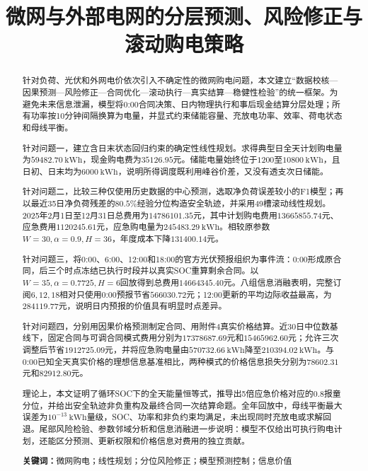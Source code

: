 \documentclass[UTF8,12pt,a4paper]{ctexart}
\title{微网与外部电网的分层预测、风险修正与滚动购电策略}
\author{}\date{}
\newcommand{\keywords}[1]{\par\noindent\textbf{关键词：}#1}
\theoremstyle{remark}
\begin{document}
\maketitle

\begin{abstract}
针对负荷、光伏和外网电价依次引入不确定性的微网购电问题，本文建立“数据校核—因果预测—风险修正—合同优化—滚动执行—真实结算—稳健性检验”的统一框架。为避免未来信息泄漏，模型将0:00合同决策、日内物理执行和事后现金结算分层处理；所有功率按10分钟间隔换算为电量，并显式约束储能容量、充放电功率、效率、荷电状态和母线平衡。

针对问题一，建立含日末状态回归约束的确定性线性规划。求得典型日全天计划购电量为$59482.70\ \mathrm{kWh}$，现金购电费为$35126.95$元。储能电量始终位于$1200$至$10800\ \mathrm{kWh}$，且日初、日末均为$6000\ \mathrm{kWh}$，说明所得调度既利用峰谷价差，又没有透支次日储能。

针对问题二，比较三种仅使用历史数据的中心预测，选取净负荷误差较小的F1模型；再以最近35日净负荷残差的$80.5\%$经验分位构造安全轨迹，并采用49槽滚动线性规划。2025年2月1日至12月31日总费用为$14786101.35$元，其中计划购电费用$13665855.74$元、应急费用$1120245.61$元，应急购电量为$245483.29\ \mathrm{kWh}$。相较原参数$W=30,\alpha=0.9,H=36$，年度成本下降$131400.14$元。

针对问题三，将0:00、6:00、12:00和18:00的官方光伏预报组织为事件流：0:00形成原合同，后三个时点冻结已执行时段并以真实SOC重算剩余合同。以$W=35,\alpha=0.7725,H=6$回放得到总费用$14664345.40$元。八组信息消融表明，完整订阅${6,12,18}$相对只使用0:00预报节省$566030.72$元；12:00更新的平均边际收益最高，为$284119.77$元，说明日内预报的价值具有明显时点差异。

针对问题四，分别用因果价格预测制定合同、用附件4真实价格结算。近30日中位数基线下，固定合同与可调合同模式费用分别为$17378687.69$元和$15465962.60$元；允许三次调整后节省$1912725.09$元，并将应急购电量由$570732.66\ \mathrm{kWh}$降至$210394.02\ \mathrm{kWh}$。与0:00已知全天真实价格的理想信息基准相比，两种模式的价格信息损失分别为$78602.31$元和$82912.80$元。

理论上，本文证明了循环SOC下的全天能量恒等式，推导出5倍应急价格对应的0.8报童分位，并给出安全轨迹非负重构及最终合同一次结算命题。全年回放中，母线平衡最大误差为$10^{-13}\ \mathrm{kWh}$量级，SOC、功率和非负约束均满足，未出现同时充放电或求解回退。尾部风险检验、参数邻域分析和信息消融进一步说明：模型不仅给出可执行购电计划，还能区分预测、更新权限和价格信息对费用的独立贡献。
\keywords{微网购电；线性规划；分位风险修正；模型预测控制；信息价值}
\end{abstract}
\clearpage
\end{document}
